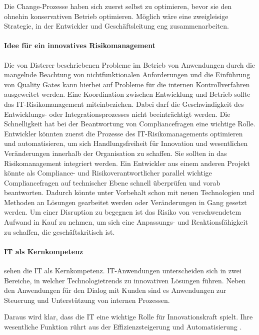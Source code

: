 Die Change-Prozesse haben sich zuerst selbst zu optimieren, bevor sie den ohnehin konservativen Betrieb optimieren. Möglich wäre eine zweigleisige Strategie, in der Entwickler und Geschäftsleitung eng zusammenarbeiten.

\paragraph{Idee für ein innovatives Risikomanagement}
Die von Disterer beschriebenen Probleme im Betrieb von Anwendungen durch die mangelnde Beachtung von nichtfunktionalen Anforderungen und die Einführung von Quality Gates \cite{mci/Disterer2011} kann hierbei auf Probleme für die internen Kontrollverfahren ausgeweitet werden. Eine Koordination zwischen Entwicklung und Betrieb sollte das IT-Risikomanagement miteinbeziehen. Dabei darf die Geschwindigkeit des Entwicklungs- oder Integrationsprozesses nicht beeinträchtigt werden. Die Schnelligkeit hat bei der Beantwortung von Compliancefragen eine wichtige Rolle. Entwickler könnten zuerst die Prozesse des IT-Risikomanagements optimieren und automatisieren, um sich Handlungsfreiheit für Innovation und wesentlichen Veränderungen innerhalb der Organisation zu schaffen. Sie sollten in das Risikomanagement integriert werden. Ein Entwickler aus einem anderen Projekt könnte als Compliance- und Risikoverantwortlicher parallel wichtige Compliancefragen auf technischer Ebene schnell überprüfen und vorab beantworten. Dadurch könnte unter Vorbehalt schon mit neuen Technologien und Methoden an Lösungen gearbeitet werden oder Veränderungen in Gang gesetzt werden. Um einer Disruption zu begegnen ist das Risiko von verschwendetem Aufwand in Kauf zu nehmen, um sich eine Anpassungs- und Reaktionsfähigkeit zu schaffen, die geschäftskritisch ist.

\paragraph{IT als Kernkompetenz} 
\citet{Bussmann2006} sehen die IT als Kernkompetenz. IT-Anwendungen unterscheiden sich in zwei Bereiche, in welcher Technologietrends zu innovativen Lösungen führen. 
Neben den Anwendungen für den Dialog mit Kunden sind es Anwendungen zur Steuerung und Unterstützung von internen Prozessen.

Daraus wird klar, dass die IT eine wichtige Rolle für Innovationskraft spielt. Ihre wesentliche Funktion rührt aus der Effizienzsteigerung \citet{Gupta:2017} und Automatisierung \cite{Alt2017}.

